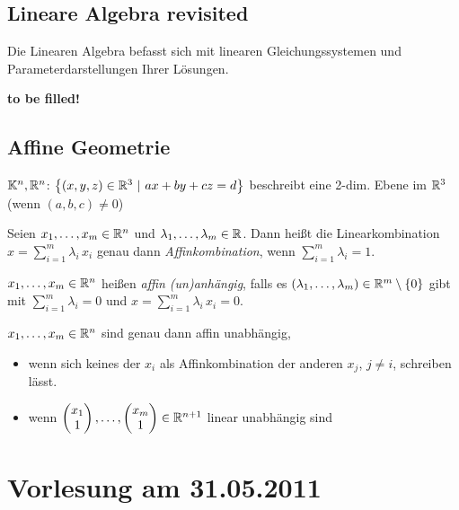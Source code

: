 \subsection*{Lineare Algebra revisited}

Die Linearen Algebra befasst sich mit linearen Gleichungssystemen und Parameterdarstellungen Ihrer
Lösungen.

{\bf to be filled!}

\subsection*{Affine Geometrie}

\begin{bem}
	$\mathbb K^n, \mathbb R^n$: $\left\{ (x,y,z) \in \mathbb R^3 \ | \ ax + by + cz = d \right\}$ beschreibt eine 2-dim.
	Ebene im $\mathbb R^3$ (wenn $(a,b,c) \neq 0$)
\end{bem}

\begin{defi}
	Seien $x_1, \dots, x_m \in \mathbb R^n$ und $\lambda_1, \dots, \lambda_m \in \mathbb R$. Dann heißt die
	Linearkombination $x = \sum\limits_{i=1}^m \lambda_i \, x_i $ genau dann {\em Affinkombination},
	wenn $\sum\limits_{i=1}^m \lambda_i = 1$.
\end{defi}

\begin{defi}
	$x_1, \dots, x_m \in \mathbb R^n$ heißen {\em affin (un)anhängig}, falls es $(\lambda_1, \dots
	,\lambda_m) \in \mathbb R^m \setminus \{ 0 \}$ gibt mit $\sum\limits_{i=1}^m \lambda_i = 0$ und $x =
	\sum\limits_{i=1}^m \lambda_i \, x_i = 0$.
\end{defi}

\begin{thm}\label{def:affinabhaengig}
	$x_1, \dots, x_m \in \mathbb R^n$ sind genau dann affin unabhängig,
	\begin{itemize}
		\item wenn sich keines der $x_i$ als Affinkombination der anderen $x_j$, $j \neq i$, schreiben
		lässt.
		\item wenn $\begin{pmatrix}{x_1}\\{1}\end{pmatrix}, \dots, \begin{pmatrix}{x_m}\\{1}\end{pmatrix} \in \mathbb R^{n+1}$ linear unabhängig sind
	\end{itemize}
\end{thm}


\section*{Vorlesung am 31.05.2011}

